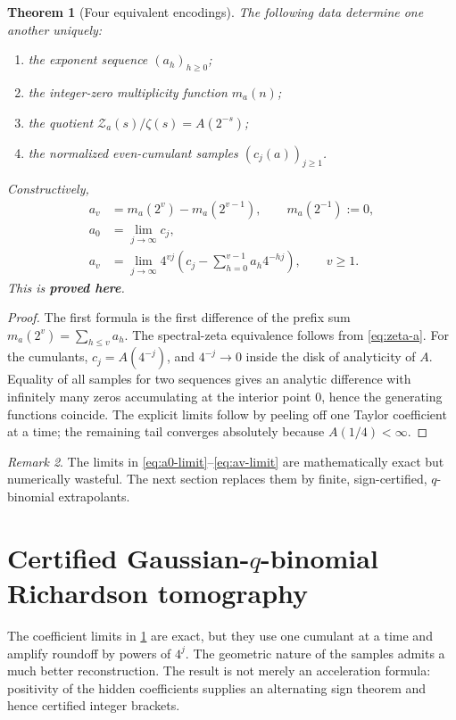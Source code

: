 \documentclass[11pt,oneside]{article}
\numberwithin{equation}{section}
\newtheorem{theorem}{Theorem}[section]
\theoremstyle{definition}
\theoremstyle{remark}
\newtheorem{remark}[theorem]{Remark}
\newcommand{\statusproved}{\textcolor{deepgreen}{\textbf{proved here}}}
\newcommand{\Zspec}{\mathcal Z}
\begin{document}
\begin{theorem}[Four equivalent encodings]
\label{thm:identifiability}
The following data determine one another uniquely:
\begin{enumerate}
\item the exponent sequence $(a_h)_{h\ge0}$;
\item the integer-zero multiplicity function $m_a(n)$;
\item the quotient $\Zspec_a(s)/\zeta(s)=A(2^{-s})$;
\item the normalized even-cumulant samples $(c_j(a))_{j\ge1}$.
\end{enumerate}
Constructively,
\begin{align}
 a_v&=m_a(2^v)-m_a(2^{v-1}),
 \qquad m_a(2^{-1}):=0,
 \label{eq:a-from-zero}\\
 a_0&=\lim_{j\to\infty}c_j,
 \label{eq:a0-limit}\\
 a_v&=\lim_{j\to\infty}4^{vj}
 \left(c_j-\sum_{h=0}^{v-1}a_h4^{-hj}\right),
 \qquad v\ge1.
 \label{eq:av-limit}
\end{align}
This is \statusproved.
\end{theorem}

\begin{proof}
The first formula is the first difference of the prefix sum
$m_a(2^v)=\sum_{h\le v}a_h$.  The spectral-zeta equivalence follows from
\eqref{eq:zeta-a}.  For the cumulants, $c_j=A(4^{-j})$, and
$4^{-j}\to0$ inside the disk of analyticity of $A$.  Equality of all samples for two
sequences gives an analytic difference with infinitely many zeros accumulating at the
interior point $0$, hence the generating functions coincide.  The explicit limits follow
by peeling off one Taylor coefficient at a time; the remaining tail converges absolutely
because $A(1/4)<\infty$.
\end{proof}

\begin{remark}
The limits in \eqref{eq:a0-limit}--\eqref{eq:av-limit} are mathematically exact but
numerically wasteful.  The next section replaces them by finite, sign-certified,
$q$-binomial extrapolants.
\end{remark}

\section{Certified Gaussian-$q$-binomial Richardson tomography}
\label{sec:tomography}

The coefficient limits in \cref{thm:identifiability} are exact, but they use one cumulant at
a time and amplify roundoff by powers of $4^j$.  The geometric nature of the samples admits
a much better reconstruction.  The result is not merely an acceleration formula: positivity
of the hidden coefficients supplies an alternating sign theorem and hence certified integer
brackets.
\end{document}
